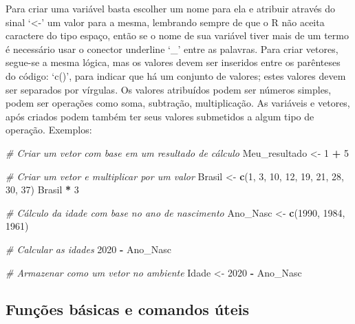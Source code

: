 \documentclass[
  brazil,
]{book}
\newenvironment{Shaded}{\begin{snugshade}}{\end{snugshade}}
\newcommand{\CommentTok}[1]{\textcolor[rgb]{0.56,0.35,0.01}{\textit{#1}}}
\newcommand{\DecValTok}[1]{\textcolor[rgb]{0.00,0.00,0.81}{#1}}
\newcommand{\KeywordTok}[1]{\textcolor[rgb]{0.13,0.29,0.53}{\textbf{#1}}}
\newcommand{\NormalTok}[1]{#1}
\newcommand{\OperatorTok}[1]{\textcolor[rgb]{0.81,0.36,0.00}{\textbf{#1}}}
\newcommand{\StringTok}[1]{\textcolor[rgb]{0.31,0.60,0.02}{#1}}
\begin{document}
Para criar uma variável basta escolher um nome para ela e atribuir através do sinal `\textless-' um valor para a mesma, lembrando sempre de que o R não aceita caractere do tipo espaço, então se o nome de sua variável tiver mais de um termo é necessário usar o conector underline `\_' entre as palavras. Para criar vetores, segue-se a mesma lógica, mas os valores devem ser inseridos entre os parênteses do código: `c()', para indicar que há um conjunto de valores; estes valores devem ser separados por vírgulas. Os valores atribuídos podem ser números simples, podem ser operações como soma, subtração, multiplicação. As variáveis e vetores, após criados podem também ter seus valores submetidos a algum tipo de operação. Exemplos:

\begin{Shaded}
\begin{Highlighting}[]
\CommentTok{# Criar um vetor com base em um resultado de cálculo}
\NormalTok{Meu_resultado <-}\StringTok{ }\DecValTok{1} \OperatorTok{+}\StringTok{ }\DecValTok{5}

\CommentTok{# Criar um vetor e multiplicar por um valor}
\NormalTok{Brasil <-}\StringTok{ }\KeywordTok{c}\NormalTok{(}\DecValTok{1}\NormalTok{, }\DecValTok{3}\NormalTok{, }\DecValTok{10}\NormalTok{, }\DecValTok{12}\NormalTok{, }\DecValTok{19}\NormalTok{, }\DecValTok{21}\NormalTok{, }\DecValTok{28}\NormalTok{, }\DecValTok{30}\NormalTok{, }\DecValTok{37}\NormalTok{)}
\NormalTok{Brasil }\OperatorTok{*}\StringTok{ }\DecValTok{3}

\CommentTok{# Cálculo da idade com base no ano de nascimento}
\NormalTok{Ano_Nasc <-}\StringTok{ }\KeywordTok{c}\NormalTok{(}\DecValTok{1990}\NormalTok{, }\DecValTok{1984}\NormalTok{, }\DecValTok{1961}\NormalTok{)}

\CommentTok{# Calcular as idades}
\DecValTok{2020} \OperatorTok{-}\StringTok{ }\NormalTok{Ano_Nasc}

\CommentTok{# Armazenar como um vetor no ambiente}
\NormalTok{Idade <-}\StringTok{ }\DecValTok{2020} \OperatorTok{-}\StringTok{ }\NormalTok{Ano_Nasc}
\end{Highlighting}
\end{Shaded}

\hypertarget{funuxe7uxf5es-buxe1sicas-e-comandos-uxfateis}{%
\subsection{Funções básicas e comandos úteis}\label{funuxe7uxf5es-buxe1sicas-e-comandos-uxfateis}}
\end{document}
